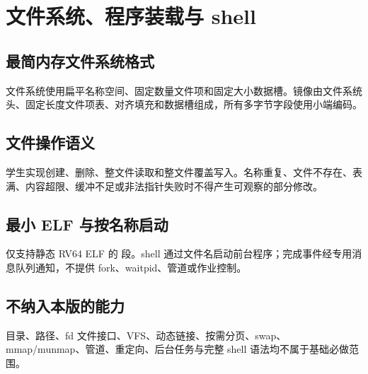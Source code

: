 \chapter{文件系统、程序装载与 shell}

\section{最简内存文件系统格式}
文件系统使用扁平名称空间、固定数量文件项和固定大小数据槽。镜像由文件系统头、固定长度文件项表、对齐填充和数据槽组成，所有多字节字段使用小端编码。

\section{文件操作语义}
学生实现创建、删除、整文件读取和整文件覆盖写入。名称重复、文件不存在、表满、内容超限、缓冲不足或非法指针失败时不得产生可观察的部分修改。

\section{最小 ELF 与按名称启动}
仅支持静态 RV64  ELF 的  段。shell 通过文件名启动前台程序；完成事件经专用消息队列通知，不提供 fork、waitpid、管道或作业控制。

\section{不纳入本版的能力}
目录、路径、fd 文件接口、VFS、动态链接、按需分页、swap、mmap/munmap、管道、重定向、后台任务与完整 shell 语法均不属于基础必做范围。

